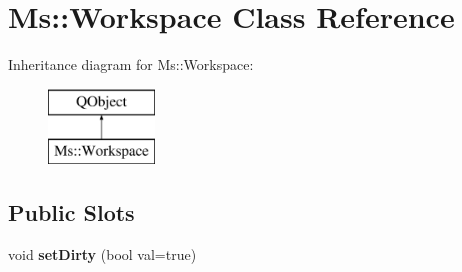 \hypertarget{class_ms_1_1_workspace}{}\section{Ms\+:\+:Workspace Class Reference}
\label{class_ms_1_1_workspace}
Inheritance diagram for Ms\+:\+:Workspace\+:\begin{figure}[H]
\begin{center}
\leavevmode
\includegraphics[height=2.000000cm]{class_ms_1_1_workspace}
\end{center}
\end{figure}
\subsection*{Public Slots}
\begin{DoxyCompactItemize}
\item 
\mbox{\label{class_ms_1_1_workspace_a68d1a1e913353b1103b8ba26685d9f7c}} 
void {\bfseries set\+Dirty} (bool val=true)
\end{DoxyCompactItemize}
